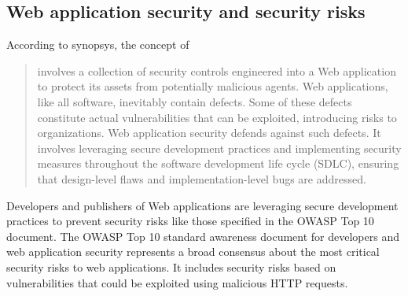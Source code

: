 \subsection{Web application security and security risks}
According to synopsys, the concept of 
\begin{quote}
	involves a collection of security controls engineered into a Web application to protect its assets from potentially malicious agents. Web applications, like all software, inevitably contain defects. Some of these defects constitute actual vulnerabilities that can be exploited, introducing risks to organizations. Web application security defends against such defects. It involves leveraging secure development practices and implementing security measures throughout the software development life cycle (SDLC), ensuring that design-level flaws and implementation-level bugs are addressed.
\end{quote}
Developers and publishers of Web applications are leveraging secure development practices to prevent security risks like those specified in the OWASP Top 10 document.
The OWASP Top 10 standard awareness document for developers and web application security represents a broad consensus about the most critical security risks to web applications.
It includes security risks based on vulnerabilities that could be exploited using malicious HTTP requests.
\cite{OWASP/Top10}


